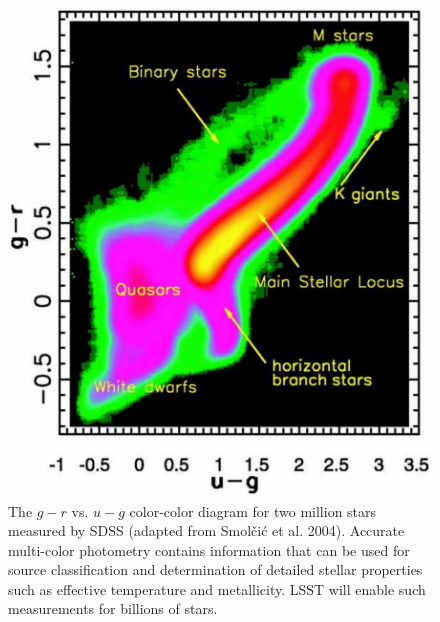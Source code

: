\documentclass{emulateapj}
\begin{document}
\begin{figure}
\includegraphics[width=1.0\hsize,clip]{smolcic.pdf}
\caption{The $g-r$ vs. $u-g$ color-color diagram for two million stars measured by 
SDSS (adapted from Smol\v{c}i\'{c} et al. 2004). Accurate multi-color photometry 
contains information that can be used for source classification and determination of 
detailed stellar properties such as effective temperature and metallicity. LSST will 
enable such measurements for billions of stars.} 
\label{Fig:FeH}
\end{figure}
\end{document}
